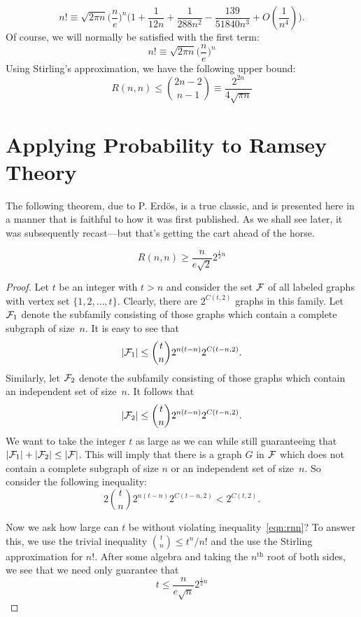 \[
n!\equiv \sqrt{2\pi n} \bigl( \frac{n}{e}\bigr)^n\bigl(1+
  \frac{1}{12n}+\frac{1}{288n^2}-\frac{139}{51840n^3} +O(\frac{1}{n^4})\bigr).
\]
Of course, we will normally be satisfied with the
first term:
\[
n!\equiv \sqrt{2\pi n} \bigl( \frac{n}{e}\bigr)^n
\]
Using Stirling's approximation, we have the following
upper bound:
\[
R(n,n) \le \binom{2n-2}{n-1} \equiv \frac{2^{2n}}{4\sqrt{\pi n}} 
\]


\section{Applying Probability to Ramsey Theory}

The following theorem, due to P. Erd\"os, is a true classic,
and is presented here in a manner that is faithful to how it
was first published.  As we shall see later, it was subsequently
recast---but that's getting the cart ahead of the horse.

\begin{theorem}\label{thm:rnn}
\[
R(n,n) \ge \frac{n}{e\sqrt2} 2^{\frac{1}{2}n}
\]
\end{theorem}

\begin{proof}
Let $t$ be an integer with $t>n$ and consider the set $\mathcal{F}$ of
all labeled graphs with vertex set $\{1,2,\dots,t\}$.  Clearly,
there are $2^{C(t,2)}$ graphs in this family.  Let $\mathcal{F}_1$ denote the
subfamily consisting of those graphs which contain a complete subgraph of
size~$n$.  It is easy to see that
\[
|\mathcal{F}_1|\le \binom{t}{n}2^{n(t-n)}2^{C(t-n,2)}.
\]
Similarly, let $\mathcal{F}_2$ denote the subfamily consisting of those graphs which 
contain an independent set of size~$n$.  It follows that
\[
|\mathcal{F}_2|\le \binom{t}{n}2^{n(t-n)}2^{C(t-n,2)}.
\]
We want to take the integer $t$ as large as we can while still guaranteeing that
$|\mathcal{F}_1|+|\mathcal{F}_2|\le |\mathcal{F}|$.  This will imply that there is a graph
$G$ in $\mathcal{F}$ which does not contain a complete subgraph of size $n$ or
an independent set of size~$n$.   So consider the following inequality:
\begin{equation}\label{eqn:rnn}
2\binom{t}{n}2^{n(t-n)}2^{C(t-n,2)}<2^{C(t,2)}.
\end{equation}

Now we ask how large can $t$ be without violating inequality~\ref{eqn:rnn}?
To answer this, we use the trivial inequality $\binom{t}{n}\le t^n/n!$ and the
use the Stirling approximation for $n!$.  After some algebra and taking the
$n^{\text{th}}$ root of both sides, we see 
that we need only guarantee that 
\[
t\le \frac{n}{e\sqrt{n}}2^{\frac{1}{2}n} 
\]
\end{proof}


